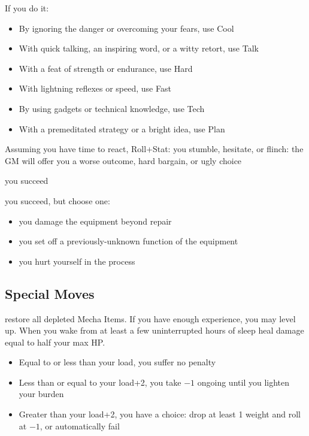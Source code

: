 If you do it:
\begin{itemize}
\item By ignoring the danger or overcoming your fears, use Cool
\item With quick talking, an inspiring word, or a witty retort, use Talk
\item With a feat of strength or endurance, use Hard
\item With lightning reflexes or speed, use Fast
\item By using gadgets or technical knowledge, use Tech
\item With a premeditated strategy or a bright idea, use Plan
\end{itemize}
Assuming you have time to react, Roll+Stat:
{you stumble, hesitate, or flinch: the GM will offer you a worse outcome, hard bargain, or ugly choice}

{you succeed}
{you succeed, but choose one:
\begin{itemize}
\item you damage the equipment beyond repair
\item you set off a previously-unknown function of the equipment
\item you hurt yourself in the process
\end{itemize}}

\subsection{Special Moves}

 restore all depleted Mecha Items. If you have enough experience, you may level up. When you wake from at least a few uninterrupted hours of sleep heal damage equal to half your max HP.

\begin{itemize}
\item Equal to or less than your load, you suffer no penalty
\item Less than or equal to your load+2, you take $-1$ ongoing until you lighten your burden
\item Greater than your load+2, you have a choice: drop at least 1 weight and roll at $-1$, or automatically fail
\end{itemize}

